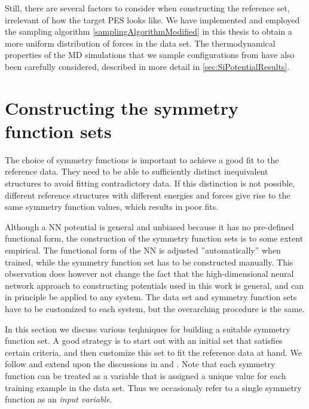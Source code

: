 \documentclass[twoside,english]{uiofysmaster}
\begin{document}
Still, there are several factors to consider when constructing the reference set, irrelevant of how the target PES looks like.  
We have implemented and employed the sampling algorithm \eqref{samplingAlgorithmModified} in this thesis to obtain a more uniform
distribution of forces in the data set. The thermodynamical properties of the MD simulations that we sample configurations 
from have also been carefully considered, described in more detail in \autoref{sec:SiPotentialResults}.  



\section{Constructing the symmetry function sets} \label{sec:constructingSymmetry}
The choice of symmetry functions is important to achieve a good fit to the reference data. 
They need to be able to sufficiently distinct inequivalent structures to avoid fitting 
contradictory data. If this distinction is not possible, different reference structures with 
different energies and forces give rise to the same symmetry function values, which results in poor fits. 

Although a NN potential is general and unbiased because it has no pre-defined functional form, the 
construction of the symmetry function sets is to some extent empirical. The functional form of the NN
is adjusted ''automatically'' when trained, while the symmetry function set has to be constructed manually.
This observation does however not change the fact that the high-dimensional neural network approach to
constructing potentials used in this work is general, and can in principle be applied to any system. The data set
and symmetry function sets have to be customized to each system, but the overarching procedure is the same. 

In this section we discuss various teqhniques for building a suitable symmetry function set. 
A good strategy is to start out with an initial set that satisfies certain criteria, and then customize this set to 
fit the reference data at hand. We follow and extend upon the discussions in \cite{Behler11symmetry} and \cite{Behler15}. 
Note that each symmetry function 
can be treated as a variable that is assigned a unique value for each training example in the data set. 
Thus we occasionaly refer to a single symmetry function as an \textit{input variable}.  
\end{document}
